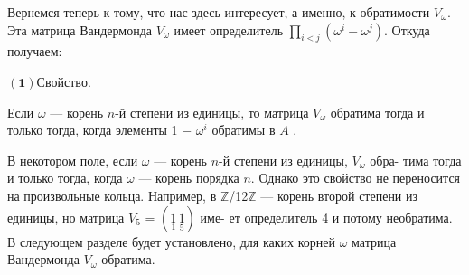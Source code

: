 \vspace{3pt}Вернемся теперь к тому, что нас здесь интересует, а именно, к \linebreak
обратимости $V_\omega$. Эта матрица Вандермонда $V_\omega$ имеет определитель \linebreak
$\prod_{i<j}(\omega^i - \omega^j)$. Откуда получаем: \ 

\vspace{3pt}$\mathbf{(1)}$\hspace{3pt}$\mathbf{Свойство.}$\ 

\vspace{3pt}Если $\omega$ --- корень $n$-й степени из единицы, то матрица $V_\omega$ обратима \linebreak
тогда и только тогда, когда элементы  1 $-$ $\omega^i$ обратимы в $A$ . \ 

\vspace{6pt}В некотором поле, если $\omega$ --- корень $n$-й степени из единицы, $V_\omega$ обра­- \linebreak
тима тогда и только тогда, когда $\omega$ --- корень порядка $n$. Однако это \linebreak
свойство не переносится на произвольные кольца. Например, в $\mathbb Z$/12$\mathbb Z$  --- корень второй степени из единицы, но матрица $V_5$ = $\left(\underset{1}{1} \hspace{2pt}\underset{5}{1}\right)$ име­- \linebreak
ет определитель 4 и потому необратима. В следующем разделе будет \linebreak
установлено, для каких корней $\omega$ матрица Вандермонда $V_\omega$ обратима. 

